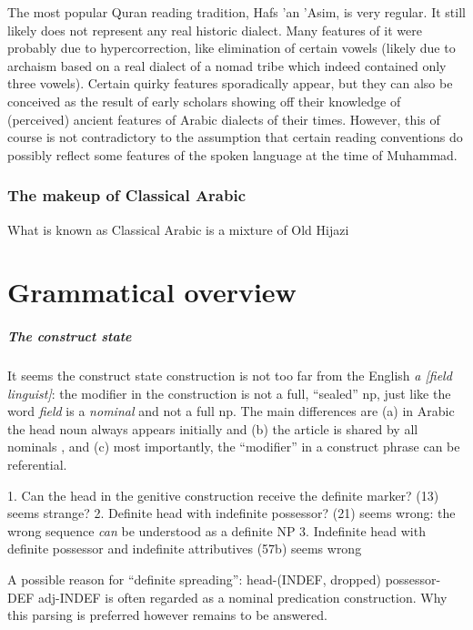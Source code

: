 \documentclass[a4paper, oneside, 12pt]{report}
\newcommand*{\term}[1]{\emph{#1}}
\newcommand{\form}[1]{\emph{#1}}
\begin{document}
The most popular Quran reading tradition, Hafs 'an 'Asim, is very regular. 
It still likely does not represent any real historic dialect.
Many features of it were probably due to hypercorrection,
like elimination of certain vowels 
(likely due to archaism based on a real dialect of a nomad tribe
which indeed contained only three vowels).
Certain quirky features sporadically appear,
but they can also be conceived as the result of early scholars showing off their knowledge 
of (perceived) ancient features of Arabic dialects of their times.
However, this of course is not contradictory to the assumption that 
certain reading conventions do possibly reflect some features of the spoken language 
at the time of Muhammad.



\subsection{The makeup of Classical Arabic}


What is known as Classical Arabic is a mixture of Old Hijazi 

\chapter{Grammatical overview}

\paragraph*{The construct state}
It seems the construct state construction is not too far from the English \form{a [field linguist]}:
the modifier in the construction is not a full, ``sealed'' \ac{np},
just like the word \form{field} is a \term{nominal} and not a full \ac{np}.
The main differences are 
(a) in Arabic the head noun always appears initially and 
(b) the article is shared by all nominals \citep{alqahtani2016structure}, and 
(c) most importantly, the ``modifier'' in a construct phrase can be referential.

1. Can the head in the genitive construction receive the definite marker? (13) seems strange?
2. Definite head with indefinite possessor? (21) seems wrong: the wrong sequence \emph{can} be understood as a definite NP
3. Indefinite head with definite possessor and indefinite attributives (57b) seems wrong

A possible reason for ``definite spreading'': head-(INDEF, dropped) possessor-DEF adj-INDEF is often regarded as a nominal predication construction.
Why this parsing is preferred however remains to be answered.
\end{document}
